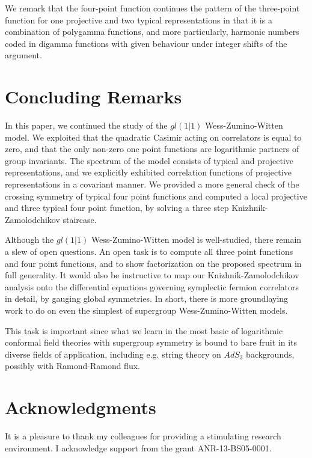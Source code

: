 \documentclass[12pt]{article}
\numberwithin{equation}{section}
\numberwithin{equation}{section}
\numberwithin{table}{section}\setlength{\multlinegap}{25pt}
\begin{document}
 We remark that the four-point function continues the pattern
of the three-point function for one projective and two typical representations in that it is a combination of polygamma functions,
and more
particularly, harmonic numbers coded in digamma functions with given behaviour under integer shifts of the argument. 


\section{Concluding Remarks}
\label{conclusions}
In this paper, we continued the study of the $gl(1|1)$ Wess-Zumino-Witten model. We
exploited that the quadratic Casimir acting on correlators is equal to
zero, and that the only non-zero one point functions are logarithmic partners
of group invariants.  The spectrum of the model consists of typical
and projective representations, and we explicitly exhibited 
correlation functions of projective representations in a covariant manner. We
provided a more general check of the crossing symmetry of typical
four point functions and computed a local projective and three typical
four point function, by solving a three step Knizhnik-Zamolodchikov
staircase.

Although the $gl(1|1)$ Wess-Zumino-Witten model is well-studied, there remain a slew of open questions. An open task is to compute
all three point functions and four point functions, and to show factorization on the proposed spectrum in full generality.
 It would also be instructive to map our Knizhnik-Zamolodchikov analysis 
onto the differential equations governing symplectic fermion correlators in detail, by gauging global symmetries.
In short, there is more groundlaying work to do on even the simplest of supergroup Wess-Zumino-Witten models.

This  task is important since what we learn in the most basic of logarithmic conformal field theories
with supergroup symmetry is bound to bare fruit in its diverse fields of application, including e.g.
 string theory on $AdS_3$ backgrounds, possibly with Ramond-Ramond flux.



\section*{Acknowledgments}
It is a pleasure to thank my colleagues  for providing a stimulating research environment. I
acknowledge  support from the grant ANR-13-BS05-0001.
\end{document}
